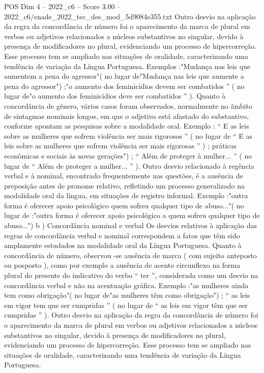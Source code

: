 \begin{textsample}{POS Dim 4 – 2022\_c6 – Score 3.00 – 2022\_c6/enade\_2022\_tec\_des\_mod\_5d9084e355.txt}
Outro desvio na aplicação da regra da concordância de número foi o aparecimento da marca de plural em verbos ou adjetivos relacionados a núcleos substantivos no singular, devido à presença de modificadores no plural, evidenciando um processo de hipercorreção.
Esse processo tem se ampliado nas situações de oralidade, caracterizando uma tendência de variação da Língua Portuguesa.
Exemplos :"Mudança nas leis que aumentem a pena do agressor"( no lugar de"Mudança nas leis que aumente a pena do agressor") ;"o aumento dos feminicídios devem ser combatidos ” ( no lugar de"o aumento dos feminicídios deve ser combatidos ” ).
Quanto à concordância de gênero, vários casos foram observados, normalmente no âmbito de sintagmas nominais longos, em que o adjetivo está afastado do substantivo, conforme apontam as pesquisas sobre a modalidade oral.
Exemplo : “ E as leis sobre as mulheres que sofrem violência ser mais rigorosos ” ( no lugar de “ E as leis sobre as mulheres que sofrem violência ser mais rigorosas ” ) ; práticas econômicas e sociais às novas gerações") ; “ Além de proteger à mulher... ” ( no lugar de “ Além de proteger a mulher... ” ).
Outro desvio relacionado à regência verbal e à nominal, encontrado frequentemente nas questões, é a ausência de preposição antes de pronome relativo, refletindo um processo generalizado na modalidade oral da língua, em situações de registro informal.
Exemplo :"outra forma é oferecer apoio psicológico quem sofreu qualquer tipo de abuso..."( no lugar de :"outra forma é oferecer apoio psicológico a quem sofreu qualquer tipo de abuso...") b ) Concordância nominal e verbal Os desvios relativos à aplicação das regras de concordância verbal e nominal correspondem a fatos que têm sido amplamente estudados na modalidade oral da Língua Portuguesa.
Quanto à concordância de número, observou -se ausência de marca ( com sujeito anteposto ou posposto ), como por exemplo a ausência de acento circunflexo na forma plural do presente do indicativo do verbo “ ter ”, considerada como um desvio na concordância verbal e não na acentuação gráfica.
Exemplo :"as mulheres ainda tem como obrigação"( no lugar de"as mulheres têm como obrigação") ; “ as leis em vigor tem que ser cumpridas ” ( no lugar de “ as leis em vigor têm que ser cumpridas ” ).
Outro desvio na aplicação da regra da concordância de número foi o aparecimento da marca de plural em verbos ou adjetivos relacionados a núcleos substantivos no singular, devido à presença de modificadores no plural, evidenciando um processo de hipercorreção.
Esse processo tem se ampliado nas situações de oralidade, caracterizando uma tendência de variação da Língua Portuguesa.

\end{textsample}
